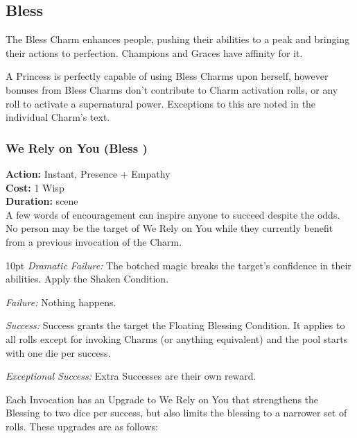 \subsection*{Bless}
\label{subsec:Bless}
The Bless Charm enhances people, pushing their abilities to a peak and bringing their actions to perfection. Champions and Graces have affinity for it.

A Princess is perfectly capable of using Bless Charms upon herself, however bonuses from Bless Charms don't contribute to Charm activation rolls, or any roll to activate a supernatural power. Exceptions to this are noted in the individual Charm's text. 

\subsubsection*{We Rely on You (Bless \textbullet)}

\noindent \textbf{Action:} Instant, Presence + Empathy\\

\noindent \textbf{Cost:} 1 Wisp\\

\noindent \textbf{Duration:} scene \\

A few words of encouragement can inspire anyone to succeed despite the odds. No person may be the target of We Rely on You while they currently benefit from a previous invocation of the Charm.

\begin{myindentpar}{10pt}  \emph{Dramatic Failure:} The botched magic breaks the target's confidence in their abilities. Apply the Shaken Condition. 

        \emph{Failure:} Nothing happens. 

        \emph{Success:} Success grants the target the Floating Blessing Condition. It applies to all rolls except for invoking Charms (or anything equivalent) and the pool starts with one die per success. 

        \emph{Exceptional Success:} Extra Successes are their own reward.\end{myindentpar}
		
\noindent Each Invocation has an Upgrade to We Rely on You that strengthens the Blessing to two dice per success, but also limits the blessing to a narrower set of rolls. These upgrades are as follows: 

